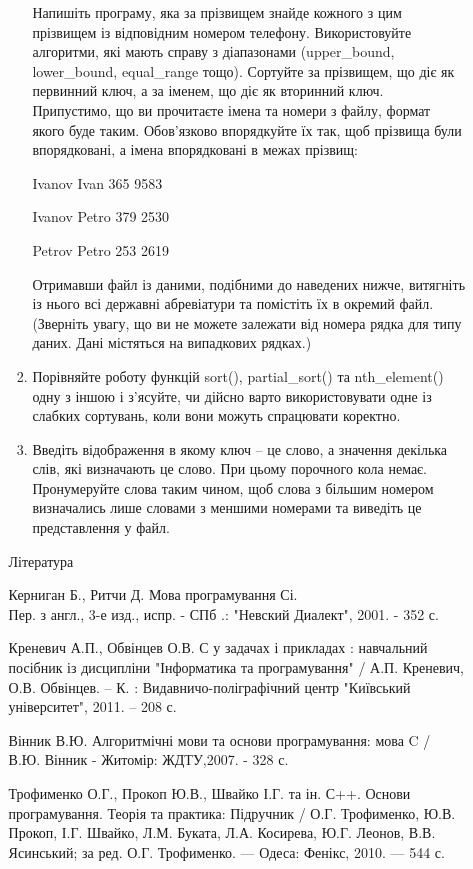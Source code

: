 \documentclass[a5paper,titlepage,openany,twoside,
]
{book_unv}%
\begin{document}
\begin{enumerate}
\begin{enumerate}
\begin{enumerate}
Напишіть програму, яка за прізвищем знайде кожного з цим прізвищем із
відповідним номером телефону. Використовуйте алгоритми, які мають справу
з діапазонами (upper\_bound, lower\_bound, equal\_range тощо). Сортуйте
за прізвищем, що діє як первинний ключ, а за іменем, що діє як вторинний
ключ. Припустимо, що ви прочитаєте імена та номери з файлу, формат якого
буде таким. Обов'язково впорядкуйте їх так, щоб прізвища були
впорядковані, а імена впорядковані в межах прізвищ:

Ivanov Ivan 365 9583

Ivanov Petro 379 2530

Petrov Petro 253 2619

Отримавши файл із даними, подібними до наведених нижче, витягніть із
нього всі державні абревіатури та помістіть їх в окремий файл. (Зверніть
увагу, що ви не можете залежати від номера рядка для типу даних. Дані
містяться на випадкових рядках.)

\item
  Порівняйте роботу функцій sort(), partial\_sort() та nth\_element()
  одну з іншою і з'ясуйте, чи дійсно варто використовувати одне із
  слабких сортувань, коли вони можуть спрацювати коректно.

\item
  Введіть відображення в якому ключ -- це слово, а значення декілька
  слів, які визначають це слово. При цьому порочного кола немає.
  Пронумеруйте слова таким чином, щоб слова з більшим номером
  визначались лише словами з меншими номерами та виведіть це представлення
у файл.
\end{enumerate}


\begin{thebibliography} {Література}

 Керниган Б., Ритчи Д. Мова програмування Сі.\\ Пер. з англ., 3-е изд., испр. - СПб .: "Невский Диалект", 2001. - 352 с. 

 Креневич А.П., Обвінцев О.В. С у задачах і прикладах : навчальний посібник із дисципліни "Інформатика та програмування" / А.П. Креневич, О.В. Обвінцев. – К. : Видавничо-поліграфічний центр "Київський університет", 2011. – 208 с.

 Вінник В.Ю. Алгоритмічні мови та основи програмування: мова C / В.Ю. Вінник - Житомір: ЖДТУ,2007. - 328 с. 

Трофименко О.Г., Прокоп Ю.В., Швайко І.Г. та ін. С++. Основи програмування. Теорія та практика:
Підручник / О.Г. Трофименко, Ю.В. Прокоп, І.Г. Швайко, Л.М. Буката, Л.А. Косирева, Ю.Г. Леонов, В.В. Ясинський; за ред. О.Г. Трофименко. — Одеса: Фенікс, 2010. — 544 с.


\end{thebibliography}
\end{enumerate}
\end{enumerate}
\end{document}
